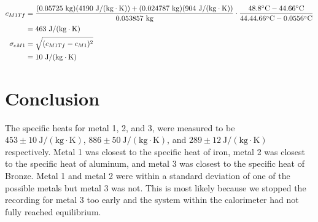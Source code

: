 \documentclass[12pt]{article}
\newcommand{\cel}{\mathrm{\degree C}}
\begin{document}
        \begin{equation}
            \begin{split}
                c_{M1Tf} &= \frac{(0.05725 \text{ kg})(4190~\mathrm{J/(kg\cdot K)})+(0.024787 \text{ kg})(904~\mathrm{J/(kg\cdot K)})}{0.053857 \text{ kg}} \cdot \frac{ 48.8\cel - 44.66 \cel }{44.44.66 \cel - 0.0556 \cel}\\
                &=463~\mathrm{J/(kg\cdot K)}\\
                \sigma_{cM1} &= \sqrt{(c_{M1Tf} - c_{M1})^2}\\
                &=10 ~\mathrm{J/(kg\cdot K)}\\
            \end{split}
        \end{equation}
    \section{Conclusion}
        The specific heats for metal 1, 2, and 3, were measured to be \(453 \pm 10 ~\mathrm{J/(kg\cdot K)}\), \(886 \pm 50 ~\mathrm{J/(kg\cdot K)}\), and \(289 \pm 12 ~\mathrm{J/(kg\cdot K)}\) respectively. Metal 1 was closest to the specific heat of iron, metal 2 was closest to the specific heat of aluminum, and metal 3 was closest to the specific heat of Bronze. Metal 1 and metal 2 were within a standard deviation of one of the possible metals but metal 3 was not. This is most likely because we stopped the recording for metal 3 too early and the system within the calorimeter had not fully reached equilibrium.
\end{document}
